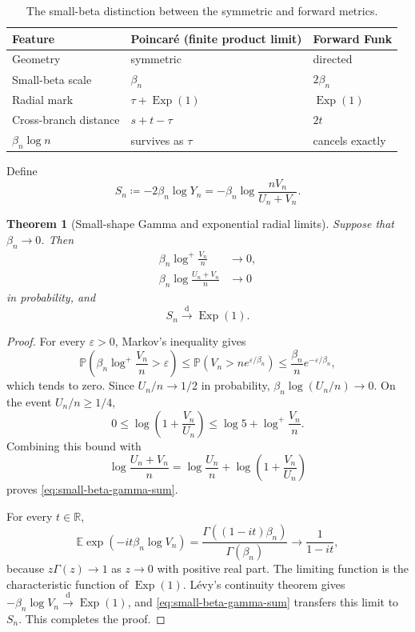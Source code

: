 \documentclass{amsart}
\numberwithin{equation}{section}
\theoremstyle{plain}
\newtheorem{theorem}{Theorem}[section]
\theoremstyle{definition}
\theoremstyle{remark}
\newcommand{\R}{\mathbb R}
\DeclareMathOperator{\Exp}{Exp}
\newcommand{\eps}{\varepsilon}
\begin{document}
\begin{table}[ht]
\centering
\small
\setlength{\tabcolsep}{5pt}
\renewcommand{\arraystretch}{1.15}
\begin{tabular}{@{}p{}p{}p{}@{}}
\toprule
\raggedright Feature & \raggedright Poincar\'e (finite product limit) & \raggedright Forward Funk \tabularnewline
\midrule
Geometry & symmetric & directed \\
Small-beta scale & $\beta_n$ & $2\beta_n$ \\
Radial mark & $\tau+\operatorname{Exp}(1)$ & $\operatorname{Exp}(1)$ \\
Cross-branch distance & $s+t-\tau$ & $2t$ \\
$\beta_n\log n$ & survives as $\tau$ & cancels exactly \\
\bottomrule
\end{tabular}
\caption{The small-beta distinction between the symmetric and forward metrics.}
\label{tab:poincare-funk-small-beta}
\end{table}

Define
\begin{equation}\label{eq:small-beta-radial} S_n\coloneqq-2\beta_n\log Y_n =-\beta_n\log\frac{nV_n}{U_n+V_n}. \end{equation}

\begin{theorem}[Small-shape Gamma and exponential radial limits]\label{thm:small-beta-radial}
Suppose that $\beta_n\to0$.  Then
\begin{align}
\beta_n\log^+\frac{V_n}{n}&\longrightarrow0, \label{eq:small-beta-upper-gamma}\\
\beta_n\log\frac{U_n+V_n}{n}&\longrightarrow0 \label{eq:small-beta-gamma-sum}
\end{align}
in probability, and
\begin{equation}\label{eq:Sn-exp} S_n\overset{\mathrm{d}}{\longrightarrow}\Exp(1). \end{equation}
\end{theorem}

\begin{proof}
For every $\eps>0$, Markov's inequality gives
\[ \mathbb P\left(\beta_n\log^+\frac{V_n}{n}>\eps\right) \le\mathbb P\left(V_n>ne^{\eps/\beta_n}\right) \le\frac{\beta_n}{n}e^{-\eps/\beta_n}, \]
which tends to zero.  Since $U_n/n\to1/2$ in probability,
$\beta_n\log(U_n/n)\to0$.  On the event $U_n/n\ge1/4$,
\[ 0\le\log\left(1+\frac{V_n}{U_n}\right) \le\log5+\log^+\frac{V_n}{n}. \]
Combining this bound with
\[ \log\frac{U_n+V_n}{n} =\log\frac{U_n}{n} +\log\left(1+\frac{V_n}{U_n}\right) \]
proves \eqref{eq:small-beta-gamma-sum}.

For every $t\in\R$,
\[ \mathbb E\exp(-it\beta_n\log V_n) =\frac{\Gamma((1-it)\beta_n)}{\Gamma(\beta_n)} \longrightarrow\frac1{1-it}, \]
because $z\Gamma(z)\to1$ as $z\to0$ with positive real part.  The limiting function is the characteristic function of $\Exp(1)$.  L\'evy's continuity theorem gives $-\beta_n\log V_n\overset{\mathrm{d}}{\longrightarrow}\Exp(1)$, and \eqref{eq:small-beta-gamma-sum} transfers this limit to $S_n$.  This completes the proof.
\end{proof}
\end{document}
